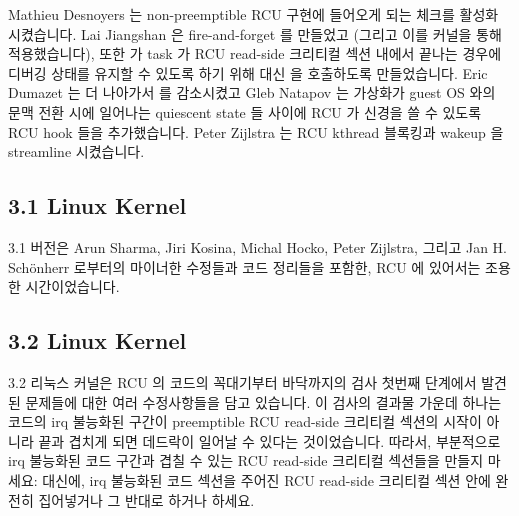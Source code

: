 Mathieu Desnoyers 는 non-preemptible RCU 구현에 들어오게 되는
 체크를 활성화 시켰습니다.
Lai Jiangshan 은 fire-and-forget  를 만들었고 (그리고 이를
커널을 통해 적용했습니다), 또한  가 task 가 RCU read-side
크리티컬 섹션 내에서 끝나는 경우에 디버깅 상태를 유지할 수 있도록 하기 위해
 대신  을 호출하도록
만들었습니다.
Eric Dumazet 는 더 나아가서  를 감소시켰고 Gleb Natapov 는
가상화가 guest OS 와의 문맥 전환 시에 일어나는 quiescent state 들 사이에 RCU 가
신경을 쓸 수 있도록 RCU hook 들을 추가했습니다.
Peter Zijlstra 는 RCU kthread 블록킹과 wakeup 을 streamline 시켰습니다.

\subsection{3.1 Linux Kernel}

3.1 버전은 Arun Sharma, Jiri Kosina, Michal Hocko, Peter Zijlstra, 그리고 Jan
H. Sch\"{o}nherr 로부터의 마이너한 수정들과 코드 정리들을 포함한, RCU 에
있어서는 조용한 시간이었습니다.

\subsection{3.2 Linux Kernel}

3.2 리눅스 커널은 RCU 의 코드의 꼭대기부터 바닥까지의 검사 첫번째 단계에서
발견된 문제들에 대한 여러 수정사항들을 담고 있습니다.
이 검사의 결과물 가운데 하나는 코드의 irq 불능화된 구간이 preemptible RCU
read-side 크리티컬 섹션의 시작이 아니라 끝과 겹치게 되면 데드락이 일어날 수
있다는 것이었습니다.
따라서, 부분적으로 irq 불능화된 코드 구간과 겹칠 수 있는 RCU read-side 크리티컬
섹션들을 만들지 마세요:
대신에, irq 불능화된 코드 섹션을 주어진 RCU read-side 크리티컬 섹션 안에 완전히
집어넣거나 그 반대로 하거나 하세요.
\iffalse

